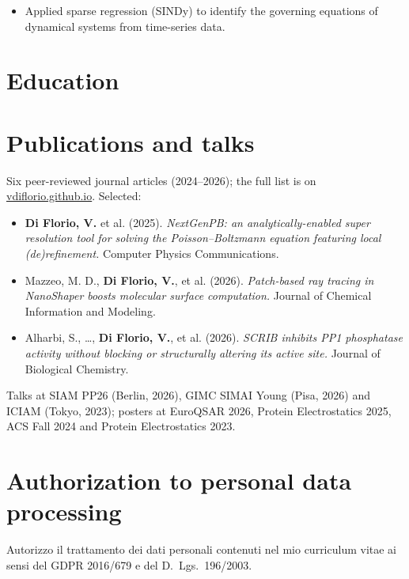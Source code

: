 \documentclass[10pt]{article}
\begin{document}
\begin{itemize}
  \item Applied sparse regression (SINDy) to identify the governing equations of dynamical systems from time-series data.
\end{itemize}

\section{Education}

\section{Publications and talks}
Six peer-reviewed journal articles (2024–2026); the full list is on \href{https://vdiflorio.github.io}{vdiflorio.github.io}. Selected:
\begin{itemize}
  \item \textbf{Di Florio, V.} et al. (2025). \emph{NextGenPB: an analytically-enabled super resolution tool for solving the Poisson–Boltzmann equation featuring local (de)refinement.} Computer Physics Communications. 
  \item Mazzeo, M. D., \textbf{Di Florio, V.}, et al. (2026). \emph{Patch-based ray tracing in NanoShaper boosts molecular surface computation.} Journal of Chemical Information and Modeling. 
  \item Alharbi, S., …, \textbf{Di Florio, V.}, et al. (2026). \emph{SCRIB inhibits PP1 phosphatase activity without blocking or structurally altering its active site.} Journal of Biological Chemistry. 
\end{itemize}
Talks at SIAM PP26 (Berlin, 2026), GIMC SIMAI Young (Pisa, 2026) and ICIAM (Tokyo, 2023); posters at EuroQSAR 2026, Protein Electrostatics 2025, ACS Fall 2024 and Protein Electrostatics 2023.

\section{Authorization to personal data processing}
{\small\color{muted}
\begin{otherlanguage}{italian}
Autorizzo il trattamento dei dati personali contenuti nel mio curriculum vitae ai sensi del GDPR 2016/679 e del D.~Lgs.~196/2003.\par
\end{otherlanguage}}
\end{document}
